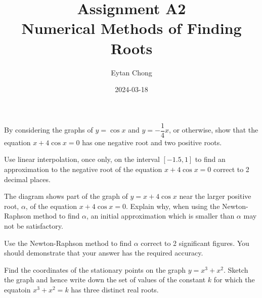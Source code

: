 \documentclass{jhwhw}
\title{Assignment A2\\Numerical Methods of Finding Roots}
\author{Eytan Chong}
\date{2024-03-18}
\begin{document}
    \problem{}
        By considering the graphs of $y = \cos x$ and $y = -\dfrac14 x$, or otherwise, show that the equation $x + 4\cos x = 0$ has one negative root and two positive roots.

        Use linear interpolation, once only, on the interval $[-1.5, 1]$ to find an approximation to the negative root of the equation $x + 4\cos x = 0$ correct to 2 decimal places.

        \begin{center}
        \end{center}

        The diagram shows part of the graph of $y = x + 4\cos x$ near the larger positive root, $\alpha$, of the equation $x + 4\cos x = 0$. Explain why, when using the Newton-Raphson method to find $\alpha$, an initial approximation which is smaller than $\alpha$ may not be satisfactory.

        Use the Newton-Raphson method to find $\alpha$ correct to 2 significant figures. You should demonstrate that your answer has the required accuracy.

    \solution

    \problem{}
        Find the coordinates of the stationary points on the graph $y = x^3 + x^2$. Sketch the graph and hence write down the set of values of the constant $k$ for which the equatoin $x^3 + x^2 = k$ has three distinct real roots.
\end{document}
